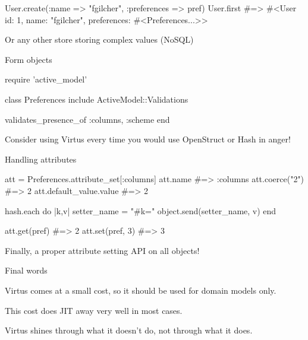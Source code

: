 User.create(:name => "fgilcher",
            :preferences => pref)
User.first
#=> #<User id: 1, name: "fgilcher", 
       preferences: #<Preferences...>>
\stopRUBY
\stopstandardmakeup

\page

\startstandardmakeup[align=middle]
Or any other store storing complex values (NoSQL)
\stopstandardmakeup

\page

\startstandardmakeup[align=middle]
Form objects
\stopstandardmakeup

\page

\startstandardmakeup[align=middle]
\startRUBY
require 'active_model'

class Preferences
  include ActiveModel::Validations

  validates_presence_of :columns, :scheme
end
\stopRUBY
\stopstandardmakeup

\page

\startstandardmakeup[align=middle]
Consider using Virtus every time you would use OpenStruct or Hash in anger!
\stopstandardmakeup

\page

\startstandardmakeup[align=middle]
Handling attributes
\stopstandardmakeup

\page

\startstandardmakeup[align=middle]
\startRUBY
att = Preferences.attribute_set[:columns]
att.name #=> :columns
att.coerce("2") #=> 2
att.default_value.value #=> 2
\stopRUBY
\stopstandardmakeup

\page

\startstandardmakeup[align=middle]
\startRUBY
hash.each do |k,v|
  setter_name = "#{k}="
  object.send(setter_name, v)
end
\stopRUBY
\stopstandardmakeup

\page

\startstandardmakeup[align=middle]
\startRUBY
att.get(pref) #=> 2
att.set(pref, 3) #=> 3
\stopRUBY
\stopstandardmakeup

\page

\startstandardmakeup[align=middle]
Finally, a proper attribute setting API on all objects!
\stopstandardmakeup

\page

\startstandardmakeup[align=middle]
Final words
\stopstandardmakeup

\page

\startstandardmakeup[align=middle]
Virtus comes at a small cost, so it should be used for domain models only.
\stopstandardmakeup

\page

\startstandardmakeup[align=middle]
This cost does JIT away very well in most cases.
\stopstandardmakeup

\page

\startstandardmakeup[align=middle]
Virtus shines through what it doesn't do, not through what it does.
\stopstandardmakeup
\stoptext
